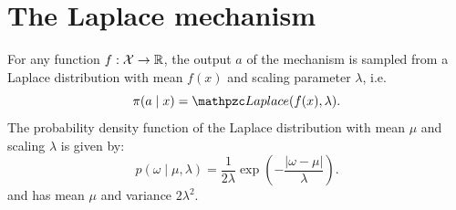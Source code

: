 \section{The Laplace mechanism}
\label{sec:laplace-mechanism}
\begin{frame}
  \begin{definition}
    For any function $f : {\mathcal{X}} \to {\mathbb{R}}$, the output $a$ of the mechanism is sampled from a Laplace distribution with mean $f(x)$ and scaling parameter $\lambda$, i.e.
    \begin{equation}
      \label{eq:laplace-mechanism}
      \pol(a \mid x) = \Laplace(f(x), \lambda).
    \end{equation}
    The probability density function of the Laplace distribution with mean $\mu$ and scaling $\lambda$ is given by:
    \[
      p(\omega \mid \mu, \lambda) = \frac{1}{2 \lambda} \exp\left(-\frac{|\omega - \mu|}{\lambda}\right).
    \]
    and has mean $\mu$ and variance $2 \lambda^2$.
  \end{definition}
\end{frame}

